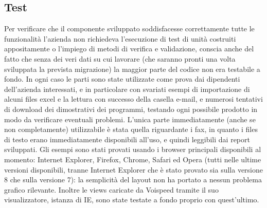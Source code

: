 \newpage
\subsection{Test}
Per verificare che il componente sviluppato soddisfacesse correttamente tutte le funzionalit\`a l'azienda non richiedeva l'esecuzione di test di unit\`a costruiti appositamente o l'impiego di metodi di verifica e validazione, conscia anche del fatto che senza dei veri dati su cui lavorare (che saranno pronti una volta sviluppata la prevista migrazione) la maggior parte del codice non era testabile a fondo. In ogni caso le parti sono state utilizzate come prova dai dipendenti dell'azienda interessati, e in particolare con svariati esempi di importazione di alcuni files excel e la lettura con successo della casella e-mail, e numerosi tentativi di download dei dimostrativi dei programmi, testando ogni possibile prodotto in modo da verificare eventuali problemi. 
L'unica parte immediatamente (anche se non completamente) utilizzabile \`e stata quella riguardante i fax, in quanto i files di testo erano immediatamente disponibili all'uso, e quindi leggibili dai report sviluppati. 
Gli esempi sono stati provati usando i browser principali disponibili al momento: Internet Explorer, Firefox, Chrome, Safari ed Opera (tutti nelle ultime versioni disponibili, tranne Internet Explorer che \`e stato provato sia sulla versione 8 che sulla versione 7): la semplicit\`a del layout non ha portato a nessun problema grafico rilevante. Inoltre le views caricate da Voispeed tramite il suo visualizzatore, istanza di IE, sono state testate a fondo proprio con quest'ultimo.

